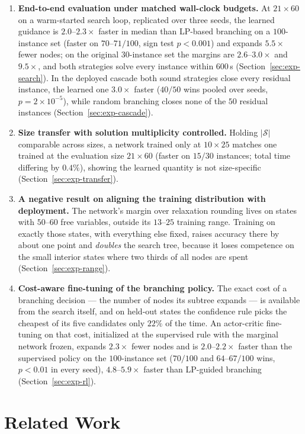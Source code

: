 \documentclass[preprint,12pt]{elsarticle}
\newcommand{\SOL}{\mathcal{S}}
\begin{document}
\begin{enumerate}
\item \textbf{End-to-end evaluation under matched wall-clock budgets.} At $21\times60$ on a warm-started search loop, replicated over three seeds, the learned guidance is $2.0$--$2.3\times$ faster in median than LP-based branching on a $100$-instance set (faster on $70$--$71/100$, sign test $p<0.001$) and expands $5.5\times$ fewer nodes; on the original $30$-instance set the margins are $2.6$--$3.0\times$ and $9.5\times$, and both strategies solve every instance within $600$\,s (Section~\ref{sec:exp-search}). In the deployed cascade both sound strategies close every residual instance, the learned one $3.0\times$ faster ($40/50$ wins pooled over seeds, $p=2\times10^{-5}$), while random branching closes none of the $50$ residual instances (Section~\ref{sec:exp-cascade}).

\item \textbf{Size transfer with solution multiplicity controlled.} Holding $|\SOL|$ comparable across sizes, a network trained only at $10\times25$ matches one trained at the evaluation size $21\times60$ (faster on $15/30$ instances; total time differing by $0.4\%$), showing the learned quantity is not size-specific (Section~\ref{sec:exp-transfer}).
\item \textbf{A negative result on aligning the training distribution with deployment.} The network's margin over relaxation rounding lives on states with $50$--$60$ free variables, outside its $13$--$25$ training range. Training on exactly those states, with everything else fixed, raises accuracy there by about one point and \emph{doubles} the search tree, because it loses competence on the small interior states where two thirds of all nodes are spent (Section~\ref{sec:exp-range}).
\item \textbf{Cost-aware fine-tuning of the branching policy.} The exact cost of a branching decision --- the number of nodes its subtree expands --- is available from the search itself, and on held-out states the confidence rule picks the cheapest of its five candidates only $22\%$ of the time. An actor-critic fine-tuning on that cost, initialized at the supervised rule with the marginal network frozen, expands $2.3\times$ fewer nodes and is $2.0$--$2.2\times$ faster than the supervised policy on the $100$-instance set ($70/100$ and $64$--$67/100$ wins, $p<0.01$ in every seed), $4.8$--$5.9\times$ faster than LP-guided branching (Section~\ref{sec:exp-rl}).
\end{enumerate}

\section{Related Work}
\label{sec:related}
\end{document}
